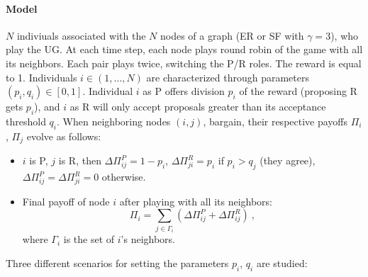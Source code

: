 \paragraph{Model} 
$N$ indiviuals associated with the $N$ nodes of a graph (ER or SF with $\gamma=3$), who play the UG. At each time step, each node plays round robin of the game with all its neighbors. Each pair plays twice, switching the P/R roles. The reward is equal to 1. Individuals $i \in \left( 1, \dots, N\right)$ are characterized through parameters $(p_i, q_i) \in \left[0, 1\right]$. Individual $i$ as P offers division $p_i$ of the reward (proposing R gets $p_i$), and $i$ as R will only accept proposals greater than its acceptance threshold $q_i$. When neighboring nodes $(i, j)$, bargain, their respective payoffs $\Pi_i$, $\Pi_j$ evolve as follows:
\begin{itemize}
	\item $i$ is P, $j$ is R, then $\Delta\Pi_{ij}^P = 1-p_i$, $\Delta\Pi_{ji}^R = p_i$ if $p_i>q_j$ (they agree), $\Delta\Pi_{ij}^P = \Delta\Pi_{ji}^R = 0$ otherwise.
	\item Final payoff of node $i$ after playing with all its neighbors: 
	\begin{equation}
		\Pi_{i} = \sum_{j\in\Gamma_i} \left(\Delta\Pi_{ij}^P + \Delta\Pi_{ij}^R\right) \ ,
	\end{equation}
	where $\Gamma_i$ is the set of $i$'s neighbors.
\end{itemize} 
Three different scenarios for setting the parameters $p_i$, $q_i$ are studied:
